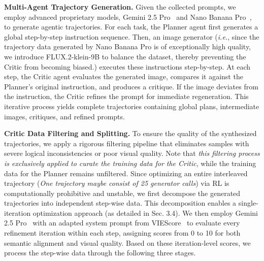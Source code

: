\documentclass{article} %
\begin{document}
\textbf{Multi-Agent Trajectory Generation.} Given the collected prompts, we employ advanced proprietary models, Gemini 2.5 Pro~\cite{gemini25pro} and Nano Banana Pro~\cite{nanopro}, to generate agentic trajectories. For each task, the Planner agent first generates a global step-by-step instruction sequence. Then, an image generator (\textit{i.e.}, since the trajectory data generated by Nano Banana Pro is of exceptionally high quality, we introduce FLUX.2-klein-9B to balance the dataset, thereby preventing the Critic from becoming biased.) executes these instructions step-by-step. At each step, the Critic agent evaluates the generated image, compares it against the Planner's original instruction, and produces a critique. If the image deviates from the instruction, the Critic refines the prompt for immediate regeneration. This iterative process yields complete trajectories containing global plans, intermediate images, critiques, and refined prompts.

\textbf{Critic Data Filtering and Splitting.} To ensure the quality of the synthesized trajectories, we apply a rigorous filtering pipeline that eliminates samples with severe logical inconsistencies or poor visual quality. Note that \textit{this filtering process is exclusively applied to curate the training data for the Critic}, while the training data for the Planner remains unfiltered. Since optimizing an entire interleaved trajectory (\textit{One trajectory maybe consist of 25 generator calls}) via RL is computationally prohibitive and unstable, we first decompose the generated trajectories into independent step-wise data. This decomposition enables a single-iteration optimization approach (as detailed in Sec. 3.4). We then employ Gemini 2.5 Pro~\cite{gemini25pro} with an adapted system prompt from VIEScore~\cite{ku2024viescore} to evaluate every refinement iteration within each step, assigning scores from 0 to 10 for both semantic alignment and visual quality. Based on these iteration-level scores, we process the step-wise data through the following three stages.
\end{document}
